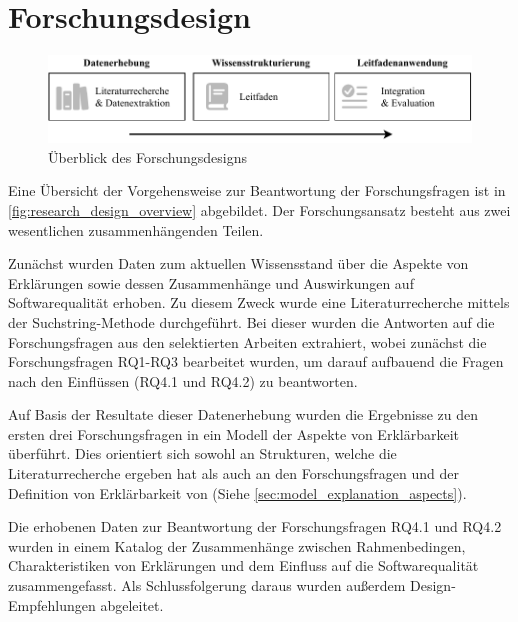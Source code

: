 \section{Forschungsdesign}
\begin{figure}[htb!]
    \begin{center}
        \includegraphics[width=\textwidth]{contents/03_research_design/res/research_design_overview.pdf}
    \end{center}
    \caption{Überblick des Forschungsdesigns}
    \label{fig:research_design_overview}
\end{figure}

Eine Übersicht der Vorgehensweise zur Beantwortung der Forschungsfragen ist in \autoref{fig:research_design_overview} abgebildet. Der Forschungsansatz besteht aus zwei wesentlichen zusammenhängenden Teilen.

Zunächst wurden Daten zum aktuellen Wissensstand über die Aspekte von Erklärungen sowie dessen Zusammenhänge und Auswirkungen auf Softwarequalität erhoben. Zu diesem Zweck wurde eine Literaturrecherche mittels der Suchstring-Methode \cite{kitchenham2004procedures} durchgeführt. Bei dieser wurden die Antworten auf die Forschungsfragen aus den selektierten Arbeiten extrahiert, wobei zunächst die Forschungsfragen RQ1-RQ3 bearbeitet wurden, um darauf aufbauend die Fragen nach den Einflüssen (RQ4.1 und RQ4.2) zu beantworten.

Auf Basis der Resultate dieser Datenerhebung wurden die Ergebnisse zu den ersten drei Forschungsfragen in ein Modell der Aspekte von Erklärbarkeit überführt. Dies orientiert sich sowohl an Strukturen, welche die Literaturrecherche ergeben hat als auch an den Forschungsfragen und der Definition von Erklärbarkeit von \citeauthor{chazette_knowledge_nodate} \cite{chazette_knowledge_nodate} (Siehe \autoref{sec:model_explanation_aspects}).

Die erhobenen Daten zur Beantwortung der Forschungsfragen RQ4.1 und RQ4.2 wurden in einem Katalog der Zusammenhänge zwischen Rahmenbedingen, Charakteristiken von Erklärungen und dem Einfluss auf die Softwarequalität zusammengefasst. Als Schlussfolgerung daraus wurden außerdem Design-Empfehlungen abgeleitet.

